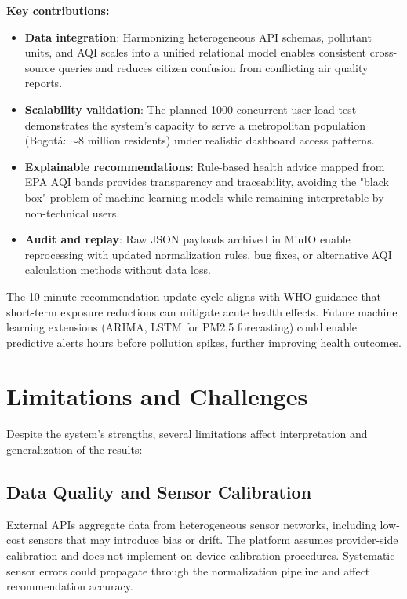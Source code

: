 \textbf{Key contributions:}
\begin{itemize}
    \item \textbf{Data integration}: Harmonizing heterogeneous API schemas, pollutant units, and AQI scales into a unified relational model enables consistent cross-source queries and reduces citizen confusion from conflicting air quality reports.
    \item \textbf{Scalability validation}: The planned 1000-concurrent-user load test demonstrates the system's capacity to serve a metropolitan population (Bogotá: $\sim$8 million residents) under realistic dashboard access patterns.
    \item \textbf{Explainable recommendations}: Rule-based health advice mapped from EPA AQI bands provides transparency and traceability, avoiding the "black box" problem of machine learning models while remaining interpretable by non-technical users.
    \item \textbf{Audit and replay}: Raw JSON payloads archived in MinIO enable reprocessing with updated normalization rules, bug fixes, or alternative AQI calculation methods without data loss.
\end{itemize}

The 10-minute recommendation update cycle aligns with WHO guidance that short-term exposure reductions can mitigate acute health effects. Future machine learning extensions (ARIMA, LSTM for PM2.5 forecasting) could enable predictive alerts hours before pollution spikes, further improving health outcomes.

\section{Limitations and Challenges}
\label{sec:limitations}

Despite the system's strengths, several limitations affect interpretation and generalization of the results:

\subsection{Data Quality and Sensor Calibration}
External APIs aggregate data from heterogeneous sensor networks, including low-cost sensors that may introduce bias or drift. The platform assumes provider-side calibration and does not implement on-device calibration procedures. Systematic sensor errors could propagate through the normalization pipeline and affect recommendation accuracy.


